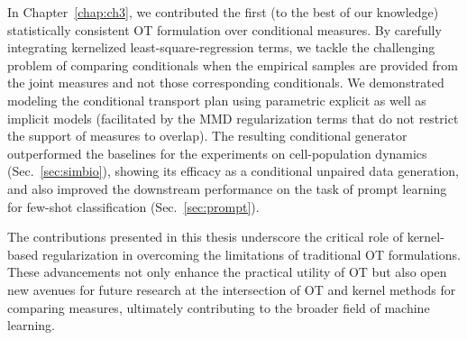In Chapter~\ref{chap:ch3}, we contributed the first (to the best of our knowledge) statistically consistent OT formulation over conditional measures. By carefully integrating kernelized least-square-regression terms, we tackle the challenging problem of comparing conditionals when the empirical samples are provided from the joint measures and not those corresponding conditionals. We demonstrated modeling the conditional transport plan using parametric explicit as well as implicit models (facilitated by the MMD regularization terms that do not restrict the support of measures to overlap). The resulting conditional generator outperformed the baselines for the experiments on cell-population dynamics (Sec.~\ref{sec:simbio}), showing its efficacy as a conditional unpaired data generation, and also improved the downstream performance on the task of prompt learning for few-shot classification (Sec.~\ref{sec:prompt}).

The contributions presented in this thesis underscore the critical role of kernel-based regularization in overcoming the limitations of traditional OT formulations. These advancements not only enhance the practical utility of OT but also open new avenues for future research at the intersection of OT and kernel methods for comparing measures, ultimately contributing to the broader field of machine learning.
